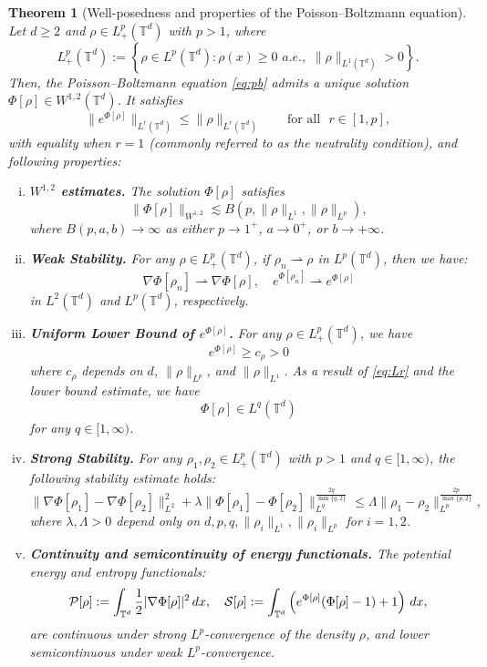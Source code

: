 \documentclass[11pt,reqno,a4paper]{amsart}
\newtheorem{theorem}{Theorem}[section]
\theoremstyle{definition}
\theoremstyle{remark}
\numberwithin{equation}{section}
\newcommand{\T} {\mathbb T}
\newcommand{\lt}{\left}
\newcommand{\rt}{\right}
\newcommand{\bq}{\begin{equation}}
\newcommand{\eq}{\end{equation}}
\newcommand{\calP}{\mathcal P}
\newcommand{\calS}{\mathcal S}
\newcommand{\weakto}{\rightharpoonup}
\newcommand{\dx}{\textnormal{d}x}
\begin{document}
\begin{theorem}[Well-posedness and properties of the Poisson--Boltzmann equation]
\label{thm:pb}
Let $ d \geq 2 $ and $ \rho \in L_+^p(\T^d) $ with $ p > 1 $, where
\[%
L^p_+(\T^d):=\lt\{\rho\in L^p(\T^d): \rho(x) \ge 0 \,\,\textit{a.e.},\,\, \|\rho\|_{L^1(\T^d)}>0\rt\}.
\]
Then, the Poisson--Boltzmann equation \eqref{eq:pb} admits a unique solution $ \Phi[\rho] \in W^{1,2}(\T^d)$. It satisfies \bq\label{eq:Lr}
    \|e^{\Phi[\rho]}\|_{L^r(\T^d)}\le \|\rho\|_{L^r(\T^d)}\qquad\text{for all}\,\,\,\,r\in[1,p],
    \eq
    with equality when $r=1$ (commonly referred to as the neutrality condition), and following properties:
\begin{enumerate}[(i)]
    \item \textbf{$W^{1,2}$ estimates.} The solution $\Phi[\rho]$ satisfies
    \[
    \|\Phi[\rho]\|_{W^{1,2}}\lesssim B(p,\|\rho\|_{L^1}, \|\rho\|_{L^p}),
    \]
    where $B(p,a,b) \to \infty$ as either $p \to 1^+$, $a \to 0^+$, or $b \to +\infty$.
    \item \textbf{Weak Stability.} 
   For any $\rho \in L^p_+(\T^d)$, if $\rho_n \weakto \rho$ in $L^p(\T^d)$, then we have:
   \[
   \nabla \Phi[\rho_n] \weakto \nabla \Phi[\rho],\quad e^{\Phi[\rho_n]}\weakto e^{\Phi[\rho]}
   \] 
   in $L^2(\T^d)$ and $L^p(\T^d)$, respectively.
    
  \item \textbf{Uniform Lower Bound of $e^{\Phi[\rho]}$.} For any $\rho \in L^p_+(\T^d)$, we have
  \[
  e^{\Phi[\rho]} \ge c_\rho >0
  \]
  where $c_\rho$ depends on $d$, $\|\rho\|_{L^p}$, and $\|\rho\|_{L^1}$. As a result of \eqref{eq:Lr} and the lower bound estimate, we have
    \begin{equation} \label{eq: Lq}
       \Phi[\rho] \in L^q(\T^d)
 \end{equation}
for any $q \in [1,\infty)$. 
   
    
     \item \textbf{Strong Stability.}  
    For any $\rho_1, \rho_2 \in L_+^p(\T^d)$ with $p >1$ and $q \in [1,\infty)$, the following stability estimate holds: 
    \bq\label{eq:str}
    \|\nabla \Phi[\rho_1] - \nabla \Phi[\rho_2]\|_{L^2}^2 + \lambda \|\Phi[\rho_1]-\Phi[\rho_2]\|_{L^q}^{ \frac{2q}{\min\{q,2\}} } \leq \Lambda \|\rho_1 - \rho_2\|_{L^p}^{\frac{2p}{\max\{p,2\}}},
    \eq
    where $ \lambda, \Lambda > 0 $ depend only on $ d, p, q, \|\rho_i\|_{L^1}, \|\rho_i\|_{L^p} $ for $ i = 1,2 $.
    
    \item \textbf{Continuity and semicontinuity of energy functionals.}  
    The potential energy and entropy functionals:
    \[
    \calP[\rho] := \int_{\T^d} \frac{1}{2} |\nabla \Phi[\rho]|^2 \, \dx, \quad \calS[\rho] := \int_{\T^d} \left(e^{\Phi[\rho]} (\Phi[\rho] - 1) + 1\right) \, \dx,
    \]
    are continuous under strong $L^p$-convergence of the density $\rho$, and lower semicontinuous under weak $L^p$-convergence.   
\end{enumerate}
\end{theorem}
\end{document}

